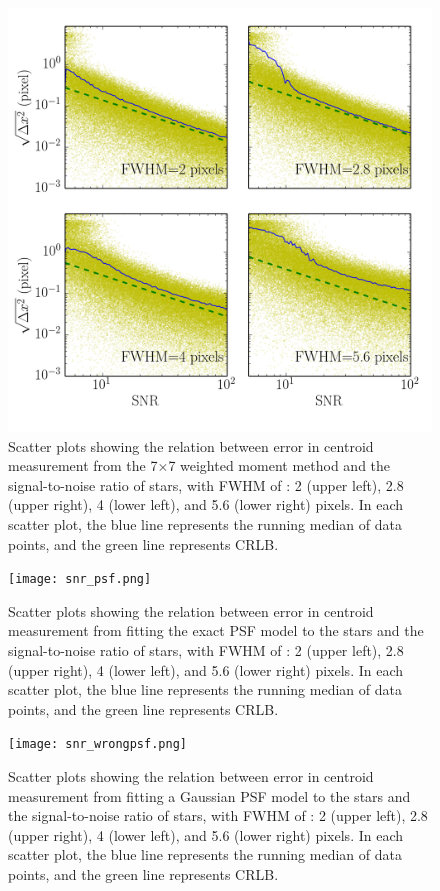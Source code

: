 \documentclass[12pt, preprint]{aastex}
\begin{document}
\begin{figure}[!htb]
  \includegraphics[width=\linewidth]{snr_moment.png}
\endminipage
\caption{Scatter plots showing the relation between error in centroid measurement
from the 7$\times$7 weighted moment method and the signal-to-noise ratio of stars,
with FWHM of : 2 (upper left), 2.8 (upper right), 4 (lower left), and 5.6 (lower right)
pixels. In each scatter plot, the blue line represents the running median of data points,
and the green line represents CRLB.}\label{4}
\end{figure}

\begin{figure}[!htb]
  \texttt{[image: snr\_psf.png]}
\endminipage
\caption{Scatter plots showing the relation between error in centroid measurement
from fitting the exact PSF model to the stars and the signal-to-noise ratio of stars,
with FWHM of : 2 (upper left), 2.8 (upper right), 4 (lower left), and 5.6 (lower right)
pixels. In each scatter plot, the blue line represents the running median of data points,
and the green line represents CRLB.}\label{5}
\end{figure}

\begin{figure}[!htb]
  \texttt{[image: snr\_wrongpsf.png]}
\endminipage
\caption{Scatter plots showing the relation between error in centroid
measurement from fitting a Gaussian PSF model to the stars and the signal-to-noise
ratio of stars, with FWHM of : 2 (upper left), 2.8 (upper right), 4 (lower left),
and 5.6 (lower right) pixels. In each scatter plot, the blue line represents the
running median of data points, and the green line represents CRLB.}\label{6}
\end{figure}
\end{document}
